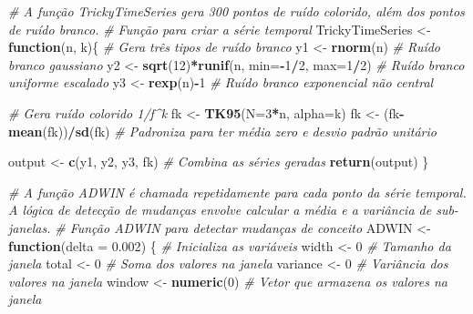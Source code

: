 \documentclass[
]{article}
\newenvironment{Shaded}{\begin{snugshade}}{\end{snugshade}}
\newcommand{\AttributeTok}[1]{\textcolor[rgb]{0.13,0.29,0.53}{#1}}
\newcommand{\CommentTok}[1]{\textcolor[rgb]{0.56,0.35,0.01}{\textit{#1}}}
\newcommand{\ControlFlowTok}[1]{\textcolor[rgb]{0.13,0.29,0.53}{\textbf{#1}}}
\newcommand{\DecValTok}[1]{\textcolor[rgb]{0.00,0.00,0.81}{#1}}
\newcommand{\FloatTok}[1]{\textcolor[rgb]{0.00,0.00,0.81}{#1}}
\newcommand{\FunctionTok}[1]{\textcolor[rgb]{0.13,0.29,0.53}{\textbf{#1}}}
\newcommand{\NormalTok}[1]{#1}
\newcommand{\OtherTok}[1]{\textcolor[rgb]{0.56,0.35,0.01}{#1}}
\newcommand{\SpecialCharTok}[1]{\textcolor[rgb]{0.81,0.36,0.00}{\textbf{#1}}}
\begin{document}
\begin{Shaded}
\begin{Highlighting}[]
\CommentTok{\# A função TrickyTimeSeries gera 300 pontos de ruído colorido, além dos pontos de ruído branco.}
\CommentTok{\# Função para criar a série temporal}
\NormalTok{TrickyTimeSeries }\OtherTok{\textless{}{-}} \ControlFlowTok{function}\NormalTok{(n, k)\{}
  \CommentTok{\# Gera três tipos de ruído branco}
\NormalTok{  y1 }\OtherTok{\textless{}{-}} \FunctionTok{rnorm}\NormalTok{(n) }\CommentTok{\# Ruído branco gaussiano}
\NormalTok{  y2 }\OtherTok{\textless{}{-}} \FunctionTok{sqrt}\NormalTok{(}\DecValTok{12}\NormalTok{)}\SpecialCharTok{*}\FunctionTok{runif}\NormalTok{(n, }\AttributeTok{min=}\SpecialCharTok{{-}}\DecValTok{1}\SpecialCharTok{/}\DecValTok{2}\NormalTok{, }\AttributeTok{max=}\DecValTok{1}\SpecialCharTok{/}\DecValTok{2}\NormalTok{) }\CommentTok{\# Ruído branco uniforme escalado}
\NormalTok{  y3 }\OtherTok{\textless{}{-}} \FunctionTok{rexp}\NormalTok{(n)}\SpecialCharTok{{-}}\DecValTok{1} \CommentTok{\# Ruído branco exponencial não central}
  
  \CommentTok{\# Gera ruído colorido 1/f\^{}k}
\NormalTok{  fk }\OtherTok{\textless{}{-}} \FunctionTok{TK95}\NormalTok{(}\AttributeTok{N=}\DecValTok{3}\SpecialCharTok{*}\NormalTok{n, }\AttributeTok{alpha=}\NormalTok{k)}
\NormalTok{  fk }\OtherTok{\textless{}{-}}\NormalTok{ (fk}\SpecialCharTok{{-}}\FunctionTok{mean}\NormalTok{(fk))}\SpecialCharTok{/}\FunctionTok{sd}\NormalTok{(fk) }\CommentTok{\# Padroniza para ter média zero e desvio padrão unitário}
  
\NormalTok{  output }\OtherTok{\textless{}{-}} \FunctionTok{c}\NormalTok{(y1, y2, y3, fk) }\CommentTok{\# Combina as séries geradas}
  \FunctionTok{return}\NormalTok{(output)}
\NormalTok{\}}

\CommentTok{\# A função ADWIN é chamada repetidamente para cada ponto da série temporal. A lógica de detecção de mudanças envolve calcular a média e a variância de sub{-}janelas.}
\CommentTok{\# Função ADWIN para detectar mudanças de conceito}
\NormalTok{ADWIN }\OtherTok{\textless{}{-}} \ControlFlowTok{function}\NormalTok{(}\AttributeTok{delta =} \FloatTok{0.002}\NormalTok{) \{}
  \CommentTok{\# Inicializa as variáveis}
\NormalTok{  width }\OtherTok{\textless{}{-}} \DecValTok{0} \CommentTok{\# Tamanho da janela}
\NormalTok{  total }\OtherTok{\textless{}{-}} \DecValTok{0} \CommentTok{\# Soma dos valores na janela}
\NormalTok{  variance }\OtherTok{\textless{}{-}} \DecValTok{0} \CommentTok{\# Variância dos valores na janela}
\NormalTok{  window }\OtherTok{\textless{}{-}} \FunctionTok{numeric}\NormalTok{(}\DecValTok{0}\NormalTok{) }\CommentTok{\# Vetor que armazena os valores na janela}
  

\end{Highlighting}
\end{Shaded}
\end{document}

